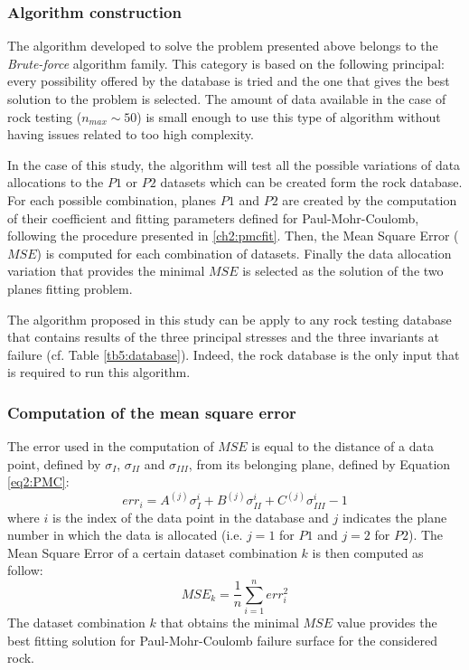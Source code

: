 \subsubsection{Algorithm construction}

The algorithm developed to solve the problem presented above belongs to the \emph{Brute-force} algorithm family. This category is based on the following principal: every possibility offered by the database is tried and the one that gives the best solution to the problem is selected. The amount of data available in the case of rock testing ($n_{max}\sim 50$) is small enough to use this type of algorithm without having issues related to too high complexity. 

In the case of this study, the algorithm will test all the possible variations of data allocations to the $P1$ or $P2$ datasets which can be created form the rock database. For each possible combination, planes $P1$ and $P2$ are created by the computation of their coefficient and fitting parameters defined for Paul-Mohr-Coulomb, following the procedure presented in \ref{ch2:pmcfit}. Then, the Mean Square Error ($MSE$) is computed for each combination of datasets. Finally the data allocation variation that provides the minimal $MSE$ is selected as the solution of the two planes fitting problem.  

The algorithm proposed in this study can be apply to any rock testing database that contains results of the three principal stresses and the three invariants at failure (cf. Table \ref{tb5:database}). Indeed, the rock database is the only input that is required to run this algorithm. 

\subsubsection{Computation of the mean square error}

The error used in the computation of $MSE$ is equal to the distance of a data point, defined by $\sigma_I$, $\sigma_{II}$ and $\sigma_{III}$, from its belonging plane, defined by Equation \ref{eq2:PMC}:
\begin{equation}\label{eq5:error}
    err_{i} = A^{(j)}\sigma_I^{i}+B^{(j)}\sigma_{II}^{i}+C^{(j)}\sigma_{III}^{i} - 1
\end{equation}
where $i$ is the index of the data point in the database and $j$ indicates the plane number in which the data is allocated (i.e. $j=1$ for $P1$ and $j=2$ for $P2$). The Mean Square Error of a certain dataset combination $k$ is then computed as follow:
\begin{equation}\label{eq5:MSE}
    MSE_k = \frac{1}{n}\sum_{i=1}^{n} err_i^2
\end{equation}
The dataset combination $k$ that obtains the minimal $MSE$ value provides the best fitting solution for Paul-Mohr-Coulomb failure surface for the considered rock. 

